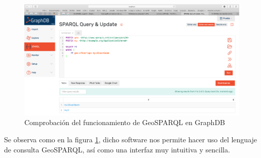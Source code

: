\begin{figure}[H]
	\centering
	\includegraphics[width=1\linewidth]{imagenes/apendices/Imagen3}
	\caption{Comprobación del funcionamiento de GeoSPARQL en GraphDB}
	\label{fig:imagen3-funciona}
\end{figure}

Se observa como en la figura \ref{fig:imagen3-funciona}, dicho software nos permite hacer uso del lenguaje de consulta GeoSPARQL, así como una interfaz muy intuitiva y sencilla.






